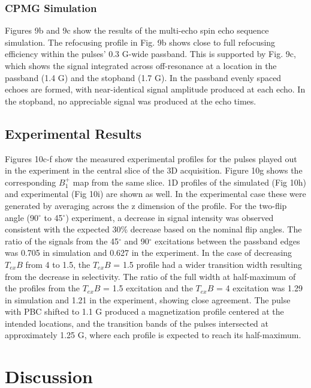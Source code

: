 \documentclass{article}
\begin{document}
\subsubsection*{CPMG Simulation}
Figures 9b and 9c show the results of the multi-echo spin echo sequence simulation.
The refocusing profile in Fig. 9b shows close to full refocusing efficiency within the pulses' 0.3 G-wide passband. 
This is supported by Fig. 9c, 
which shows the signal integrated across off-resonance at a location in the passband (1.4 G) and the stopband (1.7 G). 
In the passband evenly spaced echoes are formed, with near-identical signal amplitude produced at each echo. 
In the stopband, no appreciable signal was produced at the echo times. 

\subsection*{Experimental Results}
Figures 10c-f show the measured experimental profiles for the pulses played out in the experiment in the central slice of the 3D acquisition. Figure 10g shows the corresponding $B_1^+$ map from the same slice. 1D profiles of the simulated (Fig 10h) and experimental (Fig 10i) are shown as well. In the experimental case these were generated by averaging across the z dimension of the profile.
For the two-flip angle (90$^\circ$ to 45$^\circ$) experiment, a decrease in signal intensity was observed consistent with the expected 30\% decrease based on the nominal flip angles. 
The ratio of the signals from the 45$^\circ$ and 90$^\circ$ excitations between the passband edges was 0.705 in simulation and 0.627 in the experiment.  
In the case of decreasing $T_{ex}B$ from 4 to 1.5, the $T_{ex}B$ = 1.5 profile had a wider transition width resulting from the decrease in selectivity.
The ratio of the full width at half-maximum of the profiles from the $T_{ex}B$ = 1.5 excitation and the $T_{ex}B$ = 4 excitation was 1.29 in simulation and 1.21 in the experiment, showing close agreement. 
The pulse with PBC shifted to 1.1 G produced a magnetization profile centered at the intended locations, 
and the transition bands of the pulses intersected at approximately 1.25 G, 
where each profile is expected to reach its half-maximum.

\section*{Discussion}
\end{document}
